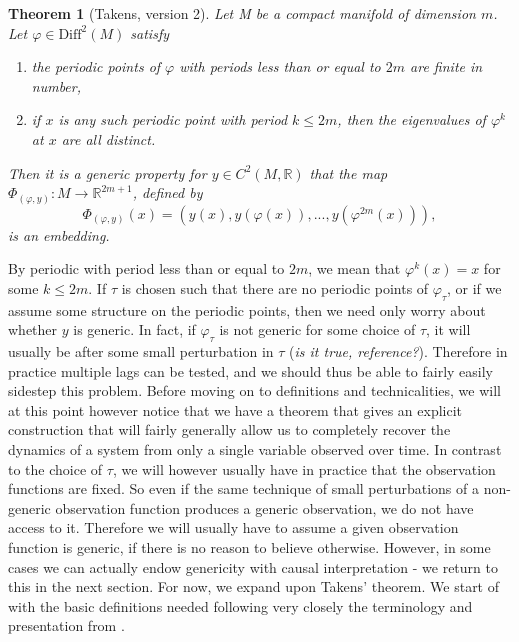 \documentclass[11pt, a4paper]{memoir}
\theoremstyle{break}
\newtheorem{thm}{Theorem}
\theoremstyle{break}
\theoremstyle{nonumberplain}
\newcommand{\mR}{\mathbb{R}}
\begin{document}
\begin{thm}[Takens, version 2]
Let M be a compact manifold of dimension $m$. Let $\varphi\in\text{Diff}^2(M)$ satisfy
\begin{enumerate}[label=\arabic*)]
	\item the periodic points of $\varphi$ with periods less than or equal to $2m$ are finite in number,
	\item if $x$ is any such periodic point with period $k\leqslant 2m$, then the eigenvalues of $\varphi^k$ at $x$ are all distinct.
\end{enumerate}
 Then it is a generic property for $y\in C^2(M,\mR)$ that the map $\Phi_{(\varphi,y)}:M\to \mathbb{R}^{2m+1}$, defined by
$$\Phi_{(\varphi,y)}(x)=(y(x),y(\varphi(x)),...,y(\varphi^{2m}(x))),$$
is an embedding. \cite{Huke}
\end{thm}
By periodic with period less than or equal to $2m$, we mean that $\varphi^{k}(x)=x$ for some $k\leqslant 2m$. If $\tau$ is chosen such that there are no periodic points of $\varphi_\tau$, or if we assume some structure on the periodic points, then we need only worry about whether $y$ is generic. In fact, if $\varphi_\tau$ is not generic for some choice of $\tau$, it will usually be after some small perturbation in $\tau$ (\textit{is it true, reference?}). Therefore in practice multiple lags can be tested, and we should thus be able to fairly easily sidestep this problem. Before moving on to definitions and technicalities, we will at this point however notice that we have a theorem that gives an explicit construction that will fairly generally allow us to completely recover the dynamics of a system from only a single variable observed over time. In contrast to the choice of $\tau$, we will however usually have in practice that the observation functions are fixed. So even if the same technique of small perturbations of a non-generic observation function produces a generic observation, we do not have access to it. Therefore we will usually have to assume a given observation function is generic, if there is no reason to believe otherwise. However, in some cases we can actually endow genericity with causal interpretation - we return to this in the next section. For now, we expand upon Takens' theorem.  We start of with the basic definitions needed following very closely the terminology and presentation from \cite{Huke2}. 
\end{document}
